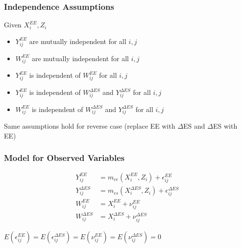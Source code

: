 \documentclass[handout]{beamer}\usepackage[]{graphicx}\usepackage[]{color}
\begin{document}
\begin{frame}
\frametitle{Independence Assumptions}
Given $X_i^{EE}, Z_i$

\begin{itemize}
\item
$Y^{EE}_{ij}$ are mutually independent for all $i,j$ \\
\item
$W_{ij}^{EE}$ are mutually independent for all $i,j$ \\
\item
$Y_{ij}^{EE}$ is independent of $W_{ij}^{EE}$ for all $i,j$ \\
\item
$Y_{ij}^{EE}$ is independent of $W_{ij}^{\Delta ES}$ and $Y_{ij}^{\Delta ES}$ for all $i,j$ \\
\item
$W_{ij}^{EE}$ is independent of $W_{ij}^{\Delta ES}$ and $Y_{ij}^{\Delta ES}$ for all $i,j$ \\
\end{itemize}

\vspace{0.2cm}

Same assumptions hold for reverse case (replace EE with $\Delta$ES and $\Delta$ES with EE)


\end{frame}


\begin{frame}
\frametitle{Model for Observed Variables}


\begin{align*}
  Y_{ij}^{EE} &= m_{ee}(X_i^{EE} ,Z_i) + \epsilon_{ij}^{EE}   \\
  Y_{ij}^{\Delta ES} &= m_{es}(X_i^{\Delta ES} ,Z_i) + \epsilon_{ij}^{\Delta ES} \\
  W_{ij}^{EE} &= X_i^{EE}  + \nu_{ij}^{EE} \\
  W_{ij}^{\Delta ES} &= X_i^{\Delta ES}  + \nu_{ij}^{\Delta ES}
\end{align*}

\vspace{0.5cm}
$E(\epsilon_{ij}^{EE}) = E(\epsilon_{ij}^{\Delta ES}) = E(\nu_{ij}^{EE}) = E(\nu_{ij}^{\Delta ES}) = 0$

\end{frame}
\end{document}

